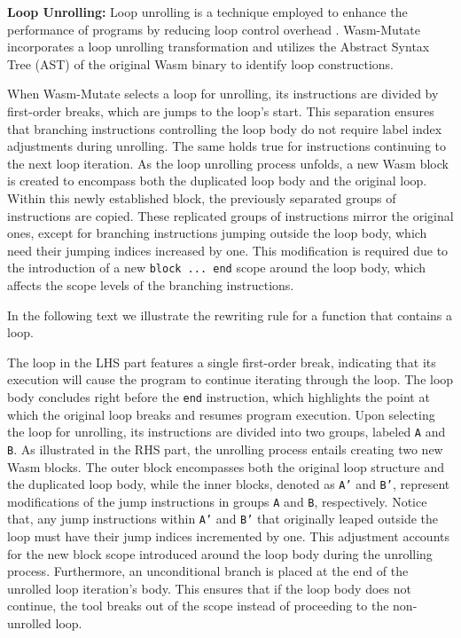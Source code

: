\documentclass[sigplan,screen]{acmart}
\newcommand{\tool}{{\sc Wasm-Mutate}\xspace}
\begin{document}
\textbf{Loop Unrolling:} 
Loop unrolling is a technique employed to enhance the performance of programs by reducing loop control overhead \cite{dongarra1979unrolling}. 
\tool incorporates a loop unrolling transformation and utilizes the Abstract Syntax Tree (AST) of the original Wasm binary to identify loop constructions. 

When \tool selects a loop for unrolling, its instructions are divided by first-order breaks, which are jumps to the loop's start. This separation ensures that branching instructions controlling the loop body do not require label index adjustments during unrolling. The same holds true for instructions continuing to the next loop iteration.
As the loop unrolling process unfolds, a new Wasm block is created to encompass both the duplicated loop body and the original loop. 
Within this newly established block, the previously separated groups of instructions are copied. 
These replicated groups of instructions mirror the original ones, except for branching instructions jumping outside the loop body, which need their jumping indices increased by one. This modification is required due to the introduction of a new \texttt{block ... end} scope around the loop body, which affects the scope levels of the branching instructions.

In the following text we illustrate the rewriting rule for a function that contains a loop. 


The loop in the LHS part features a single first-order break, indicating that its execution will cause the program to continue iterating through the loop. 
The loop body concludes right before the \texttt{end} instruction, which highlights the point at which the original loop breaks and resumes program execution.
Upon selecting the loop for unrolling, its instructions are divided into two groups, labeled \texttt{A} and \texttt{B}. 
As illustrated in the RHS part, the unrolling process entails creating two new Wasm blocks. 
The outer block encompasses both the original loop structure and the duplicated loop body, while the inner blocks, denoted as \texttt{A'} and \texttt{B'}, represent modifications of the jump instructions in groups \texttt{A} and \texttt{B}, respectively.
Notice that, any jump instructions within \texttt{A'} and \texttt{B'} that originally leaped outside the loop must have their jump indices incremented by one. 
This adjustment accounts for the new block scope introduced around the loop body during the unrolling process. 
Furthermore, an unconditional branch is placed at the end of the unrolled loop iteration's body. 
This ensures that if the loop body does not continue, the tool breaks out of the scope instead of proceeding to the non-unrolled loop.
\end{document}
